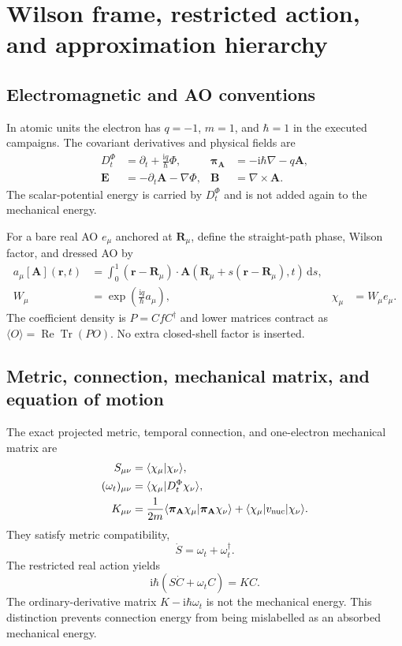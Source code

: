 \documentclass[11pt]{article}
\newcommand{\iu}{\mathrm{i}}
\newcommand{\dd}{\mathrm{d}}
\newcommand{\ReTr}{\operatorname{Re}\operatorname{Tr}}
\newcommand{\A}{\mathbf A}
\newcommand{\B}{\mathbf B}
\newcommand{\E}{\mathbf E}
\newcommand{\R}{\mathbf R}
\newcommand{\rvec}{\mathbf r}
\begin{document}
\section{Wilson frame, restricted action, and approximation hierarchy}

\subsection{Electromagnetic and AO conventions}

In atomic units the electron has $q=-1$, $m=1$, and $\hbar=1$ in the executed
campaigns.  The covariant derivatives and physical fields are
\begin{align}
 D_t^\Phi &= \partial_t+\frac{\iu q}{\hbar}\Phi,
 &\boldsymbol\pi_{\A}&=-\iu\hbar\nabla-q\A,\\
 \E&=-\partial_t\A-\nabla\Phi,
 &\B&=\nabla\times\A.
\end{align}
The scalar-potential energy is carried by $D_t^\Phi$ and is not added again
to the mechanical energy.

For a bare real AO $e_\mu$ anchored at $\R_\mu$, define the straight-path
phase, Wilson factor, and dressed AO by
\begin{align}
 a_\mu[\A](\rvec,t)
 &=\int_0^1(\rvec-\R_\mu)\cdot
 \A(\R_\mu+s(\rvec-\R_\mu),t)\,\dd s,\\
 W_\mu&=\exp\!\left(\frac{\iu q}{\hbar}a_\mu\right),
 &\chi_\mu&=W_\mu e_\mu.
\end{align}
The coefficient density is $P=CfC^\dagger$ and lower matrices contract as
$\langle O\rangle=\ReTr(PO)$.  No extra closed-shell factor is inserted.

\subsection{Metric, connection, mechanical matrix, and equation of motion}

The exact projected metric, temporal connection, and one-electron mechanical
matrix are
\begin{align}
 S_{\mu\nu}&=\langle\chi_\mu|\chi_\nu\rangle,\\
 (\omega_t)_{\mu\nu}&=\langle\chi_\mu|D_t^\Phi\chi_\nu\rangle,\\
 K_{\mu\nu}&=\frac{1}{2m}
   \langle\boldsymbol\pi_\A\chi_\mu|\boldsymbol\pi_\A\chi_\nu\rangle
   +\langle\chi_\mu|v_{\rm nuc}|\chi_\nu\rangle.
\end{align}
They satisfy metric compatibility,
\begin{equation}
 \dot S=\omega_t+\omega_t^\dagger.
\end{equation}
The restricted real action yields
\begin{equation}
 \boxed{\iu\hbar\left(S\dot C+\omega_t C\right)=KC.}
\end{equation}
The ordinary-derivative matrix $K-\iu\hbar\omega_t$ is not the mechanical
energy.  This distinction prevents connection energy from being mislabelled
as an absorbed mechanical energy.
\end{document}
